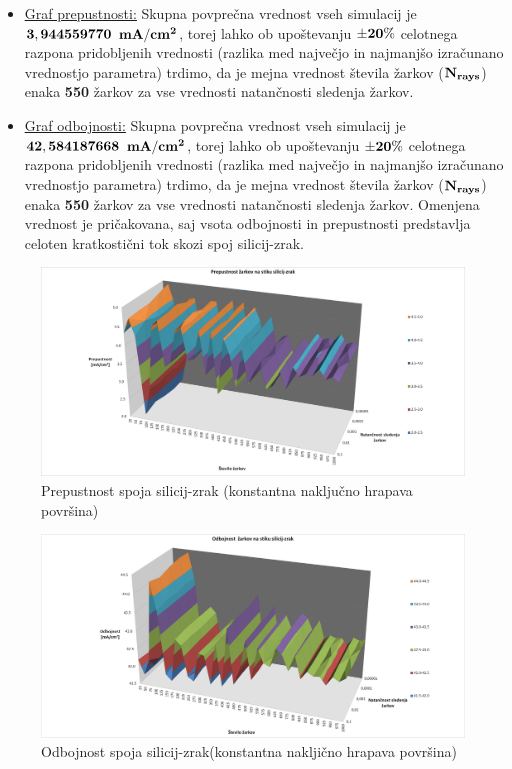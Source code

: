 \documentclass[a4paper,twoside,openright,12pt,slovene]{book}
\begin{document}
\begin{itemize}
    \item \underline{\hyperref[fig:pre_Si_air]{Graf prepustnosti:}} Skupna povprečna vrednost vseh simulacij je $\bf 3,944559770$ $\bf mA/cm^2$, torej lahko ob upoštevanju $\bf \pm 20\%$ celotnega razpona pridobljenih vrednosti (razlika med največjo in najmanjšo izračunano vrednostjo parametra) trdimo, da je mejna vrednost števila žarkov ($\bf N_{rays}$) enaka \textbf{550} žarkov za vse vrednosti natančnosti sledenja žarkov.
    
    \item \underline{\hyperref[fig:odb_Si_air]{Graf odbojnosti:}} Skupna povprečna vrednost vseh simulacij je $\bf 42,584187668$ $\bf mA/cm^2$, torej lahko ob upoštevanju $\bf \pm 20\%$ celotnega razpona pridobljenih vrednosti (razlika med največjo in najmanjšo izračunano vrednostjo parametra) trdimo, da je mejna vrednost števila žarkov ($\bf N_{rays}$) enaka \textbf{550} žarkov za vse vrednosti natančnosti sledenja žarkov. Omenjena vrednost je pričakovana, saj vsota odbojnosti in prepustnosti predstavlja celoten kratkostični tok skozi spoj silicij-zrak.
    
\end{itemize}

\begin{figure}[H]
    \centering
    \includegraphics[trim={35 4 20 1}, clip, width=150mm]{Slike/prepustnost3D_Si_air_contTexture.png}
    \caption{Prepustnost spoja silicij-zrak (konstantna naključno hrapava površina)}
    \label{fig:pre_Si_air}
\end{figure}

\begin{figure}[H]
    \centering
    \includegraphics[trim={335 2 20 2.5}, clip, width=160mm]{Slike/odbojnost3D_Si_air_contTexture.png}
    \caption{Odbojnost spoja silicij-zrak(konstantna nakljično hrapava površina)}
    \label{fig:odb_Si_air}
\end{figure}
\end{document}
